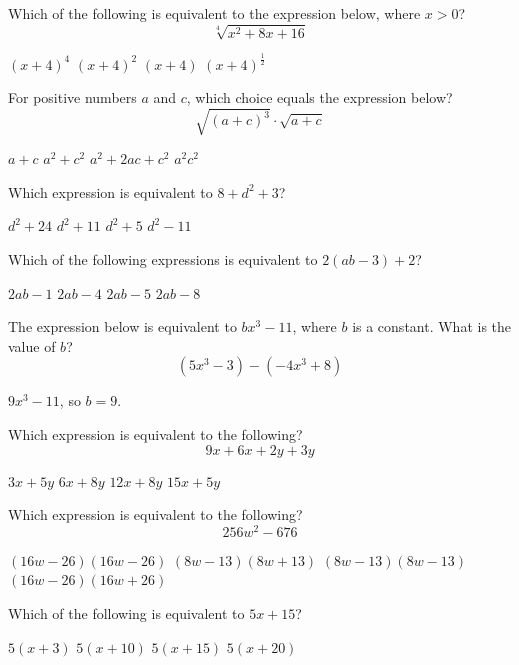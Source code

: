 \question[1]
Which of the following is equivalent to the expression below, where $x>0$?
\[
  \sqrt[4]{x^{2}+8 x+16}
\]
\begin{choices}
  \choice $(x+4)^{4}$
  \choice $(x+4)^{2}$
  \choice $(x+4)$
  \CorrectChoice $(x+4)^{\frac{1}{2}}$
\end{choices}

\question[1]
For positive numbers $a$ and $c$, which choice equals the expression below?
\[
  \sqrt{(a+c)^{3}} \cdot \sqrt{a+c}
\]
\begin{choices}
  \choice $a+c$
  \choice $a^{2}+c^{2}$
  \CorrectChoice $a^{2}+2 a c+c^{2}$
  \choice $a^{2} c^{2}$
\end{choices}

\newpage


\question[1]
Which expression is equivalent to $8+d^{2}+3$?
\begin{choices}
  \choice $d^{2}+24$
  \CorrectChoice $d^{2}+11$
  \choice $d^{2}+5$
  \choice $d^{2}-11$
\end{choices}

\question[1]
Which of the following expressions is equivalent to $2(a b-3)+2$?
\begin{choices}
  \choice $2 a b-1$
  \CorrectChoice $2 a b-4$
  \choice $2 a b-5$
  \choice $2 a b-8$
\end{choices}

\question[1]
The expression below is equivalent to $b x^{3}-11$, where $b$ is a constant. What is the value of $b$?
\[
  \left(5 x^{3}-3\right)-\left(-4 x^{3}+8\right)
\]
\begin{solutionorbox}[1in]
  $9x^{3}-11$, so $b=9$.
\end{solutionorbox}

\question[1]
Which expression is equivalent to the following?
\[
  9 x+6 x+2 y+3 y
\]
\begin{choices}
  \choice $3 x+5 y$
  \choice $6 x+8 y$
  \choice $12 x+8 y$
  \CorrectChoice $15 x+5 y$
\end{choices}

\newpage


\question[1]
Which expression is equivalent to the following?
\[
  256 w^{2}-676
\]
\begin{choices}
  \choice $(16 w-26)(16 w-26)$
  \CorrectChoice $(8 w-13)(8 w+13)$
  \choice $(8 w-13)(8 w-13)$
  \choice $(16 w-26)(16 w+26)$
\end{choices}

\question[1]
Which of the following is equivalent to $5 x+15$?
\begin{choices}
  \CorrectChoice $5(x+3)$
  \choice $5(x+10)$
  \choice $5(x+15)$
  \choice $5(x+20)$
\end{choices}

